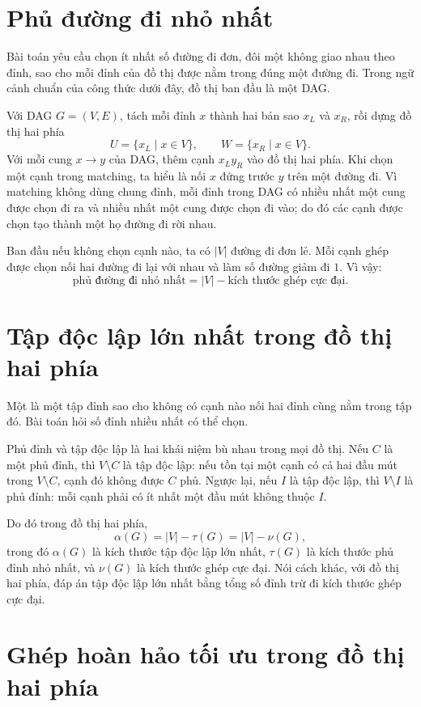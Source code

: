 \documentclass[11pt]{article}
\begin{document}
\section{Phủ đường đi nhỏ nhất}

Bài toán  yêu cầu chọn ít nhất số đường đi đơn,
đôi một không giao nhau theo đỉnh, sao cho mỗi đỉnh của đồ thị được nằm trong
đúng một đường đi. Trong ngữ cảnh chuẩn của công thức dưới đây, đồ thị ban đầu
là một DAG.

Với DAG $G=(V,E)$, tách mỗi đỉnh $x$ thành hai bản sao $x_L$ và $x_R$, rồi
dựng đồ thị hai phía
\[
  U=\{x_L\mid x\in V\},\qquad
  W=\{x_R\mid x\in V\}.
\]
Với mỗi cung $x\to y$ của DAG, thêm cạnh $x_Ly_R$ vào đồ thị hai phía. Khi
chọn một cạnh trong matching, ta hiểu là nối $x$ đứng trước $y$ trên một đường
đi. Vì matching không dùng chung đỉnh, mỗi đỉnh trong DAG có nhiều nhất một
cung được chọn đi ra và nhiều nhất một cung được chọn đi vào; do đó các cạnh
được chọn tạo thành một họ đường đi rời nhau.

Ban đầu nếu không chọn cạnh nào, ta có $|V|$ đường đi đơn lẻ. Mỗi cạnh ghép
được chọn nối hai đường đi lại với nhau và làm số đường giảm đi $1$. Vì vậy:
\[
  \text{phủ đường đi nhỏ nhất}
  =
  |V|-\text{kích thước ghép cực đại}.
\]

\section{Tập độc lập lớn nhất trong đồ thị hai phía}

Một  là một tập đỉnh sao cho không có cạnh nào nối hai đỉnh
cùng nằm trong tập đó. Bài toán hỏi số đỉnh nhiều nhất có thể chọn.

Phủ đỉnh và tập độc lập là hai khái niệm bù nhau trong mọi đồ thị. Nếu $C$ là
một phủ đỉnh, thì $V\setminus C$ là tập độc lập: nếu tồn tại một cạnh có cả hai
đầu mút trong $V\setminus C$, cạnh đó không được $C$ phủ. Ngược lại, nếu $I$
là tập độc lập, thì $V\setminus I$ là phủ đỉnh: mỗi cạnh phải có ít nhất một
đầu mút không thuộc $I$.

Do đó trong đồ thị hai phía,
\[
  \alpha(G)
  =
  |V|-\tau(G)
  =
  |V|-\nu(G),
\]
trong đó $\alpha(G)$ là kích thước tập độc lập lớn nhất, $\tau(G)$ là kích
thước phủ đỉnh nhỏ nhất, và $\nu(G)$ là kích thước ghép cực đại. Nói cách
khác, với đồ thị hai phía, đáp án tập độc lập lớn nhất bằng tổng số đỉnh trừ
đi kích thước ghép cực đại.

\section{Ghép hoàn hảo tối ưu trong đồ thị hai phía}
\end{document}
